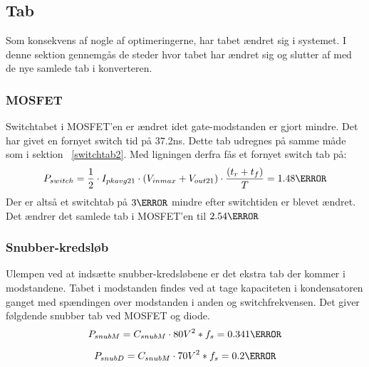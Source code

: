 \subsection{Tab}
Som konsekvens af nogle af optimeringerne, har tabet ændret sig i systemet. I denne sektion gennemgås de steder hvor tabet har ændret sig og slutter af med de nye samlede tab i konverteren.

\subsubsection{MOSFET}
Switchtabet i MOSFET'en er ændret idet gate-modstanden er gjort mindre. Det har givet en fornyet switch tid på 37.2ns. Dette tab udregnes på samme måde som i sektion ~\ref{switchtab2}. Med ligningen derfra fås et fornyet switch tab på:
\begin{equation}
P_{switch} = \frac{1}{2} \cdot I_{pkavg21} \cdot (V_{inmax}+V_{out21}) \cdot \frac{(t_r+t_f)}{T}= 1.48\watt
\end{equation} 
Der er altså et switchtab på $3\watt$ mindre efter switchtiden er blevet ændret. 
Det ændrer det samlede tab i MOSFET'en til $2.54\watt$

\subsubsection{Snubber-kredsløb}
Ulempen ved at indsætte snubber-kredsløbene er det ekstra tab der kommer i modstandene. Tabet i modstanden findes ved at tage kapaciteten i kondensatoren ganget med spændingen over modstanden i anden og switchfrekvensen.
Det giver følgdende snubber tab ved MOSFET og diode.
\begin{equation}
P_{snubM} = C_{snubM}\cdot {80V}^{2}*f_s = 0.341\watt
\end{equation} 

\begin{equation}
P_{snubD} = C_{snubM}\cdot {70V}^{2}*f_s = 0.2\watt
\end{equation}
 